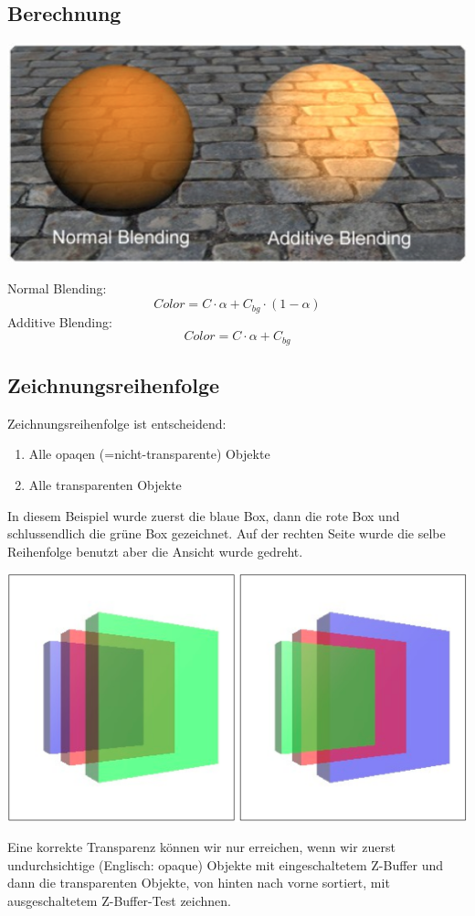 \documentclass[10pt]{article}
\begin{document}
\subsection{Berechnung}
\begin{center}
	\includegraphics[scale=0.2]{additive_blending.png}
\end{center}
Normal Blending:
\begin{equation}
	Color = C \cdot \alpha + C_{bg} \cdot (1 - \alpha)
\end{equation}
Additive Blending:
\begin{equation}
	Color = C \cdot \alpha + C_{bg}
\end{equation}

\subsection{Zeichnungsreihenfolge}
Zeichnungsreihenfolge ist entscheidend:
\begin{enumerate}
	\item Alle opaqen (=nicht-transparente) Objekte
	\item Alle transparenten Objekte
\end{enumerate}
In diesem Beispiel wurde zuerst die blaue Box, dann die rote Box und schlussendlich die grüne Box gezeichnet. Auf der rechten Seite wurde die selbe Reihenfolge benutzt aber die Ansicht wurde gedreht.
\begin{center}
	\includegraphics[scale=0.2]{alphablending_order.png}
\end{center}
Eine korrekte Transparenz können wir nur erreichen, wenn wir zuerst undurchsichtige (Englisch: opaque) Objekte mit eingeschaltetem Z-Buffer und dann die transparenten Objekte, von hinten nach vorne sortiert, mit ausgeschaltetem Z-Buffer-Test zeichnen.
\end{document}
